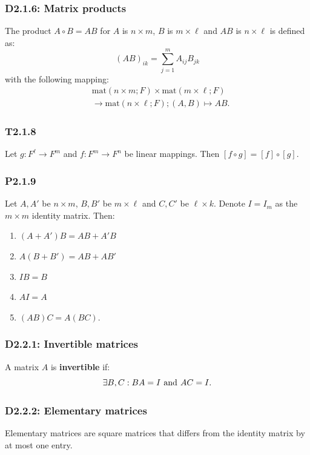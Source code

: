 \documentclass{article}
\begin{document}
\begin{multicols*}{3}
\subsubsection*{D2.1.6: Matrix products}
The product $A\circ B=AB$ for $A$ is $n\times m$,
$B$ is $m\times\ell$ and $AB$ is $n\times\ell$ is defined as:
$$(AB)_{ik}=\sum_{j=1}^{m}A_{ij}B_{jk}$$
with the following mapping:
\begin{align*}
    &\text{mat}(n\times m;F)\times\text{mat}(m\times\ell;F) \\
    &\rightarrow\text{mat}(n\times\ell;F);(A,B)\mapsto AB.
\end{align*}

\subsubsection*{T2.1.8}
Let $g:F^{\ell}\rightarrow F^m$ and
$f:F^{m}\rightarrow F^{n}$ be linear mappings.
Then $[f\circ g]=[f]\circ[g]$.

\subsubsection*{P2.1.9}
Let $A,A'$ be $n\times m$,
$B,B'$ be $m\times\ell$ and
$C,C'$ be $\ell\times k$.
Denote $I=I_m$
as the $m\times m$ identity matrix. Then:
\begin{enumerate}
    \item $(A+A')B=AB+A'B$
    \item $A(B+B')=AB+AB'$
    \item $IB=B$
    \item $AI=A$
    \item $(AB)C=A(BC)$.
\end{enumerate}

\subsubsection*{D2.2.1: Invertible matrices}
A matrix $A$ is \textbf{invertible} if:
$$\exists B,C:
BA=I\hspace{0.05in}\text{and}\hspace{0.05in}AC=I.$$

\subsubsection*{D2.2.2: Elementary matrices}
Elementary matrices are square matrices that differs from
the identity matrix by at most one entry.


\end{multicols*}
\end{document}

